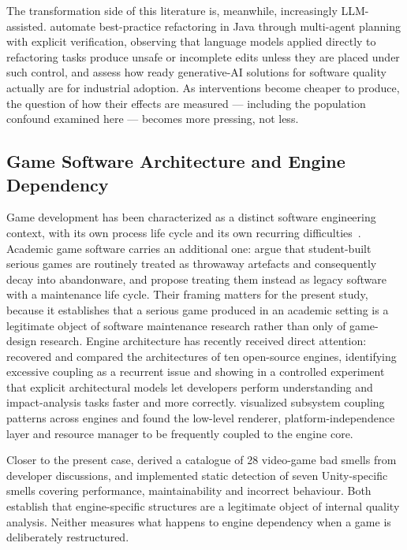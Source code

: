 \documentclass[pdflatex,sn-basic]{sn-jnl}
\begin{document}
The transformation side of this literature is, meanwhile, increasingly LLM-assisted. \citet{yang2026} automate best-practice refactoring in Java through multi-agent planning with explicit verification, observing that language models applied directly to refactoring tasks produce unsafe or incomplete edits unless they are placed under such control, and \citet{gheventer2026} assess how ready generative-AI solutions for software quality actually are for industrial adoption. As interventions become cheaper to produce, the question of how their effects are measured --- including the population confound examined here --- becomes more pressing, not less.

\subsection{Game Software Architecture and Engine Dependency}

Game development has been characterized as a distinct software engineering context, with its own process life cycle and its own recurring difficulties~\citep{aleem2016}. Academic game software carries an additional one: \citet{cerioli2026} argue that student-built serious games are routinely treated as throwaway artefacts and consequently decay into abandonware, and propose treating them instead as legacy software with a maintenance life cycle. Their framing matters for the present study, because it establishes that a serious game produced in an academic setting is a legitimate object of software maintenance research rather than only of game-design research. Engine architecture has recently received direct attention: \citet{politowski2025} recovered and compared the architectures of ten open-source engines, identifying excessive coupling as a recurrent issue and showing in a controlled experiment that explicit architectural models let developers perform understanding and impact-analysis tasks faster and more correctly. \citet{ullmann2023} visualized subsystem coupling patterns across engines and found the low-level renderer, platform-independence layer and resource manager to be frequently coupled to the engine core.

Closer to the present case, \citet{nardone2023} derived a catalogue of 28 video-game bad smells from developer discussions, and \citet{borrelli2020} implemented static detection of seven Unity-specific smells covering performance, maintainability and incorrect behaviour. Both establish that engine-specific structures are a legitimate object of internal quality analysis. Neither measures what happens to engine dependency when a game is deliberately restructured.
\end{document}
